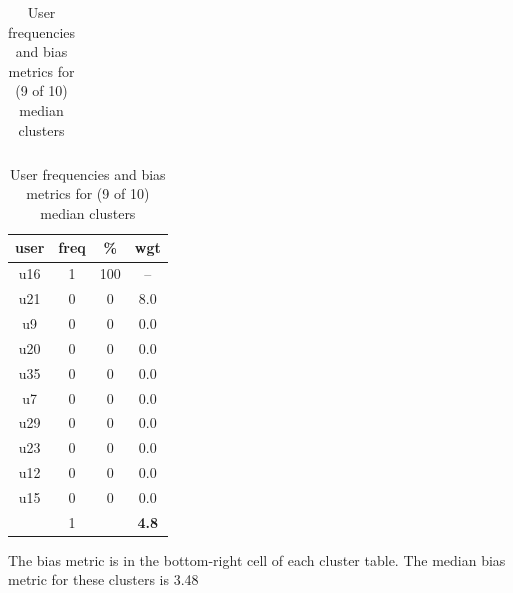 \begin{table}
\begin{tabular}{ |c|c|c|c| }
\end{tabular}
\begin{tabular}{ |c|c|c|c| }
	\hline
	\textbf{user} & \textbf{freq} & \textbf{\%} & \textbf{wgt} \\
	\hline
	u16 & 1 & 100 & -- \\
	u21 & 0 & 0 & 8.0 \\
	u9 & 0 & 0 & 0.0 \\
	u20 & 0 & 0 & 0.0 \\
	u35 & 0 & 0 & 0.0 \\
	u7 & 0 & 0 & 0.0 \\
	u29 & 0 & 0 & 0.0 \\
	u23 & 0 & 0 & 0.0 \\
	u12 & 0 & 0 & 0.0 \\
	u15 & 0 & 0 & 0.0 \\
	 & 1 & & \textbf{4.8} \\
	\hline
\end{tabular}
\caption{User frequencies and bias metrics for (9 of 10) median clusters}
{\small The bias metric is in the bottom-right cell of each cluster table. The median bias metric for these clusters is 3.48}
\end{table}

